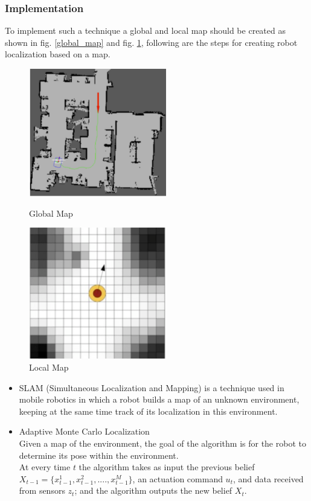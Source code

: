 \subsubsection*{Implementation}
To implement such a technique a global and local map should be created as shown in fig. \ref{global_map} and fig. \ref{local_map}, following are the steps for creating robot localization based on a map.
\begin{figure}[!htbp]
	\centering
	\begin{minipage}{.5\textwidth}
		\centering
		\includegraphics[width = 6cm]{Pictures/global}%
		\caption{Global Map}
		\label{global_map}
	\end{minipage}%
	\begin{minipage}{.5\textwidth}
		\centering
		\includegraphics[width = 6cm]{Pictures/local}%
		\caption{Local Map}
		\label{local_map}
	\end{minipage}
\end{figure}
\begin{itemize}
\item SLAM (Simultaneous Localization and Mapping) is a technique used in mobile robotics in which a robot builds a map of an unknown environment, keeping at the same time track of its localization in this environment.\\
\end{itemize}
\begin{itemize}
\item Adaptive Monte Carlo Localization
\\
Given a map of the environment, the goal of the algorithm is for the robot to determine its pose within the environment.
\\
At every time \(t\) the algorithm takes as input the previous belief \(X_{t-1}=\big\{x_{t-1}^1, x_{t-1}^2, ...., x_{t-1}^M\big\} \),  an actuation command \(u_t\), and data received from sensors \(z_t\); and the algorithm outputs the new belief \(X_t\).
\end{itemize}
